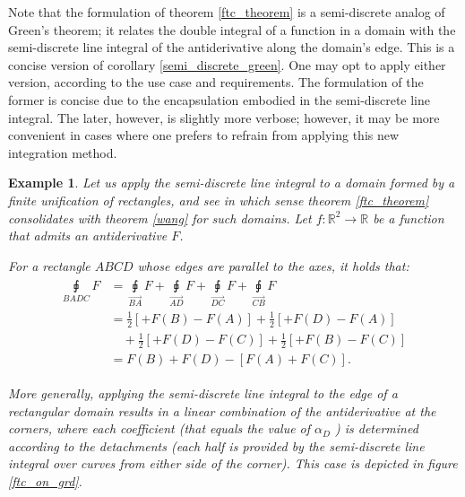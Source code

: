 \documentclass[11pt]{book}
\newtheorem{exm}[thm]{Example}
\begin{document}
\begin{remark}Note that the formulation of theorem \ref{ftc_theorem} is a semi-discrete
analog of Green's theorem; it relates the double integral of a function
in a domain with the semi-discrete line integral of the antiderivative
along the domain's edge. This is a concise version of corollary \ref{semi_discrete_green}.
One may opt to apply either version, according to the use case and
requirements. The formulation of the former is concise due to the
encapsulation embodied in the semi-discrete line integral. The later,
however, is slightly more verbose; however, it may be more convenient
in cases where one prefers to refrain from applying this new integration
method.
\end{remark}

\begin{exm}Let us apply the semi-discrete line integral to a domain
formed by a finite unification of rectangles, and see in which sense
theorem \ref{ftc_theorem} consolidates with theorem \ref{wang} for such
domains. Let $f:\mathbb{R}^{2}\rightarrow\mathbb{R}$ be a function
that admits an antiderivative $F$.

For a rectangle $ABCD$ whose edges are parallel to the axes, it holds
that:
\begin{align}
\begin{aligned}
\underset{BADC}{\sqint}F & =\underset{\overrightarrow{BA}}{\sqint}F+\underset{\overrightarrow{AD}}{\sqint}F+\underset{\overrightarrow{DC}}{\sqint}F+\underset{\overrightarrow{CB}}{\sqint}F\\
 & =\frac{1}{2}\left[+F\left(B\right)-F\left(A\right)\right]+\frac{1}{2}\left[+F\left(D\right)-F\left(A\right)\right]\\
 & \quad+\frac{1}{2}\left[+F\left(D\right)-F\left(C\right)\right]+\frac{1}{2}\left[+F\left(B\right)-F\left(C\right)\right]\\
 & =F\left(B\right)+F\left(D\right)-\left[F\left(A\right)+F\left(C\right)\right].
\end{aligned}
\end{align}

More generally, applying the semi-discrete line integral to the edge
of a rectangular domain results in a linear combination of the antiderivative
at the corners, where each coefficient (that equals the value of $\alpha_{D}$
) is determined according to the detachments (each half is provided
by the semi-discrete line integral over curves from either side of the
corner). This case is depicted in figure \ref{ftc_on_grd}.
\end{exm}
\end{document}
